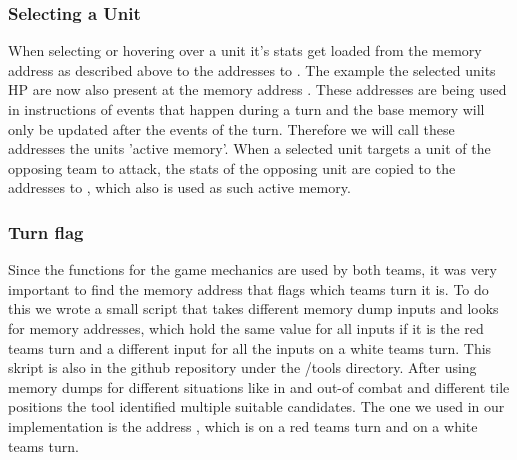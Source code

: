 \subsubsection{Selecting a Unit}
When selecting or hovering over a unit it's stats get loaded from the memory address as described above to the addresses  to . The example the selected units HP are now also present at the memory address . These addresses are being used in instructions of events that happen during a turn and the base memory will only be updated after the events of the turn. Therefore we will call these addresses the units 'active memory'.
When a selected unit targets a unit of the opposing team to attack, the stats of the opposing unit are copied to the addresses  to , which also is used as such active memory.

\subsubsection{Turn flag}
Since the functions for the game mechanics are used by both teams, it was very important to find the memory address that flags which teams turn it is. To do this we wrote a small script that takes different memory dump inputs and looks for memory addresses, which hold the same value for all inputs if it is the red teams turn and a different input for all the inputs on a white teams turn. This skript is also in the github repository under the /tools directory.
After using memory dumps for different situations like in and out-of combat and different tile positions the tool identified multiple suitable candidates. The one we used in our implementation is the address , which is  on a red teams turn and  on a white teams turn.